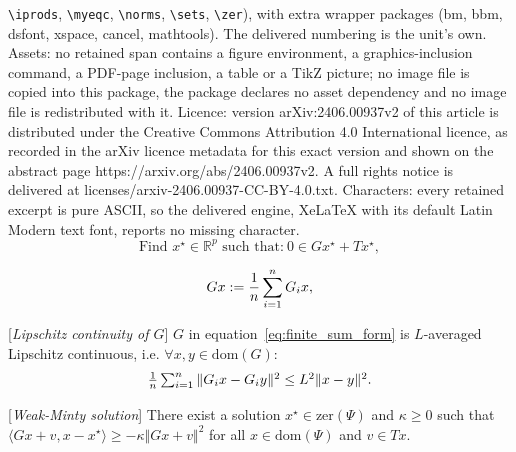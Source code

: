 \documentclass[10pt,a4paper]{amsart}
\def\eqref#1{equation~\ref{#1}}
\newcommand{\R}{\mathbb{R}}
\newcommand{\dom}[1]{\mathrm{dom}(#1)}
\newcommand{\iprods}[1]{\langle #1\rangle}
\newcommand{\norms}[1]{\Vert#1\Vert}
\newcommand{\zer}[1]{\mathrm{zer}(#1)}
\begin{document}
\texttt{\textbackslash iprods}, \texttt{\textbackslash myeqc}, \texttt{\textbackslash norms}, \texttt{\textbackslash sets}, \texttt{\textbackslash zer}), with extra wrapper packages (bm, bbm, dsfont, xspace, cancel, mathtools). The delivered numbering is the unit's own. Assets: no retained span contains a figure environment, a graphics-inclusion command, a PDF-page inclusion, a table or a TikZ picture; no image file is copied into this package, the package declares no asset dependency and no image file is redistributed with it. Licence: version arXiv:2406.00937v2 of this article is distributed under the Creative Commons Attribution 4.0 International licence, as recorded in the arXiv licence metadata for this exact version and shown on the abstract page https://arxiv.org/abs/2406.00937v2. A full rights notice is delivered at licenses/arxiv-2406.00937-CC-BY-4.0.txt. Characters: every retained excerpt is pure ASCII, so the delivered engine, XeLaTeX with its default Latin Modern text font, reports no missing character.
\begin{equation}\label{eq:NI}
\textrm{Find $x^{\star} \in \R^p$ such that:}~ 0 \in  Gx^{\star} + Tx^{\star},
\tag{NI}
\end{equation}

\begin{equation}\label{eq:finite_sum_form}
Gx := \frac{1}{n}\sum_{i=1}^nG_ix,
\vspace{-0.5ex}
\end{equation}

\begin{assumption}\label{as:A1}[\textit{Lipschitz continuity of $G$}]
$G$ in \eqref{eq:finite_sum_form} is $L$-averaged Lipschitz continuous, i.e. $\forall x, y \in \dom{G}$:
\vspace{-0.75ex}
\begin{equation}\label{eq:L_smooth}
\begin{array}{l}
\frac{1}{n} \sum_{i=1}^n \norms{G_ix - G_iy}^2 \leq L^2\norms{x - y}^2.
\end{array}
\vspace{-0.5ex}
\end{equation}
\end{assumption}

\begin{assumption}\label{as:A2}[\textit{Weak-Minty solution}]
There exist a solution $x^{\star} \in \zer{\Psi}$ and  $\kappa \geq 0$ such that $\iprods{Gx + v, x - x^{\star}} \geq - \kappa \norms{Gx + v}^2$ for all $x \in \dom{\Psi}$ and $v \in Tx$.
\end{assumption}
\end{document}

